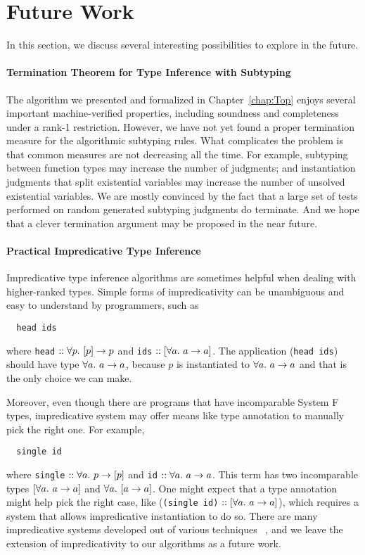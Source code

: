 \section{Future Work}

In this section, we discuss several interesting possibilities to explore in the future.

\paragraph{Termination Theorem for Type Inference with Subtyping}
The algorithm we presented and formalized in Chapter~\ref{chap:Top}
enjoys several important machine-verified properties,
including soundness and completeness under a rank-1 restriction.
However, we have not yet found a proper termination measure
for the algorithmic subtyping rules.
What complicates the problem is that
common measures are not decreasing all the time.
For example, subtyping between function types may increase the number of judgments;
and instantiation judgments that split existential variables may increase the number of
unsolved existential variables.
We are mostly convinced by the fact that
a large set of tests performed on random generated
subtyping judgments do terminate.
And we hope that a clever termination argument may be proposed in the near future.

\paragraph{Practical Impredicative Type Inference}
Impredicative type inference algorithms are sometimes helpful when dealing with
higher-ranked types.
Simple forms of impredicativity can be unambiguous and easy to understand by programmers,
such as
\begin{verbatim}
  head ids
\end{verbatim}
where \verb|head| $ :: \all[p] [p] \to p$ and \verb|ids| $ :: [\all a \to a]$.
The application (\verb|head ids|) should have type $\all a \to a$,
because $p$ is instantiated to $\all a \to a$ and that is the only choice we can make.

Moreover, even though there are programs that have incomparable System F types,
impredicative system may offer means like type annotation to manually pick the right one.
For example,
\begin{verbatim}
  single id
\end{verbatim}
where \verb|single| $ :: \all p \to [p]$ and \verb|id| $ :: \all a \to a$.
This term has two incomparable types $[\all a \to a]$ and $\all[a] [a \to a]$.
One might expect that a type annotation might help pick the right case,
like (\verb|(single id)| $ :: [\all a \to a]$),
which requires a system that allows impredicative instantiation to do so.
There are many impredicative systems developed out of various techniques~
\cite{le2003ml,leijen2008hmf,leijen2009flexible,vytiniotis2008fph,
Serrano2018,quicklook2020,FreezeML},
and we leave the extension of impredicativity to our algorithms as a future work.

